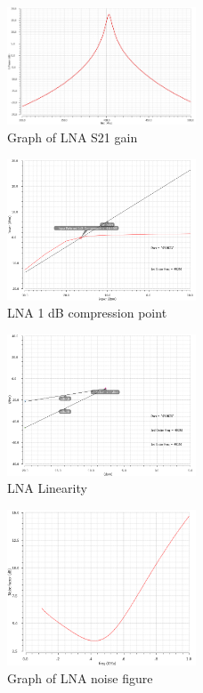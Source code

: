 \begin{figure}[h]
   \centering
    \includegraphics[width=0.5\textwidth]{figures/s21.png}
    \caption{Graph of LNA S21 gain}
    \label{fig:s21}
\end{figure}

\begin{figure}[h]
   \centering
    \includegraphics[width=0.5\textwidth]{figures/lna1db.png}
    \caption{LNA 1 dB compression point}
    \label{fig:1db}
\end{figure}

\begin{figure}[h]
   \centering
    \includegraphics[width=0.5\textwidth]{figures/lnaiip3.png}
    \caption{LNA Linearity}
    \label{fig:lnaiip3}
\end{figure}

\begin{figure}[h]
   \centering
    \includegraphics[width=0.5\textwidth]{figures/lnanoise.png}
    \caption{Graph of LNA noise figure}
    \label{fig:lnanoise}
\end{figure}

